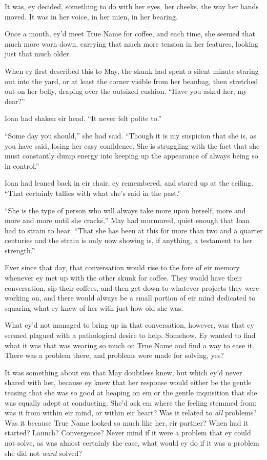 It was, ey decided, something to do with her eyes, her cheeks, the way her hands moved. It was in her voice, in her mien, in her bearing.

Once a month, ey'd meet True Name for coffee, and each time, she seemed that much more worn down, carrying that much more tension in her features, looking just that much older.

When ey first described this to May, the skunk had spent a silent minute staring out into the yard, or at least the corner visible from her beanbag, then stretched out on her belly, draping over the outsized cushion. ``Have you asked her, my dear?''

Ioan had shaken eir head. ``It never felt polite to.''

``Some day you should,'' she had said. ``Though it is my suspicion that she is, as you have said, losing her easy confidence. She is struggling with the fact that she must constantly dump energy into keeping up the appearance of always being so in control.''

Ioan had leaned back in eir chair, ey remembered, and stared up at the ceiling. ``That certainly tallies with what she's said in the past.''

``She is the type of person who will always take more upon herself, more and more and more until she cracks,'' May had murmured, quiet enough that Ioan had to strain to hear. ``That she has been at this for more than two and a quarter centuries and the strain is only now showing is, if anything, a testament to her strength.''

Ever since that day, that conversation would rise to the fore of eir memory whenever ey met up with the other skunk for coffee. They would have their conversation, sip their coffees, and then get down to whatever projects they were working on, and there would always be a small portion of eir mind dedicated to squaring what ey knew of her with just how old she was.

What ey'd not managed to bring up in that conversation, however, was that ey seemed plagued with a pathological desire to help. Somehow. Ey wanted to find what it was that was wearing so much on True Name and find a way to ease it. There was a problem there, and problems were made for solving, yes?

It was something about em that May doubtless knew, but which ey'd never shared with her, because ey knew that her response would either be the gentle teasing that she was so good at heaping on em or the gentle inquisition that she was equally adept at conducting. She'd ask em where the feeling stemmed from; was it from within eir mind, or within eir heart? Was it related to \emph{all} problems? Was it because True Name looked so much like her, eir partner? When had it started? Launch? Convergence? Never mind if it were a problem that ey could not solve, as was almost certainly the case, what would ey do if it was a problem she did not \emph{want} solved?

